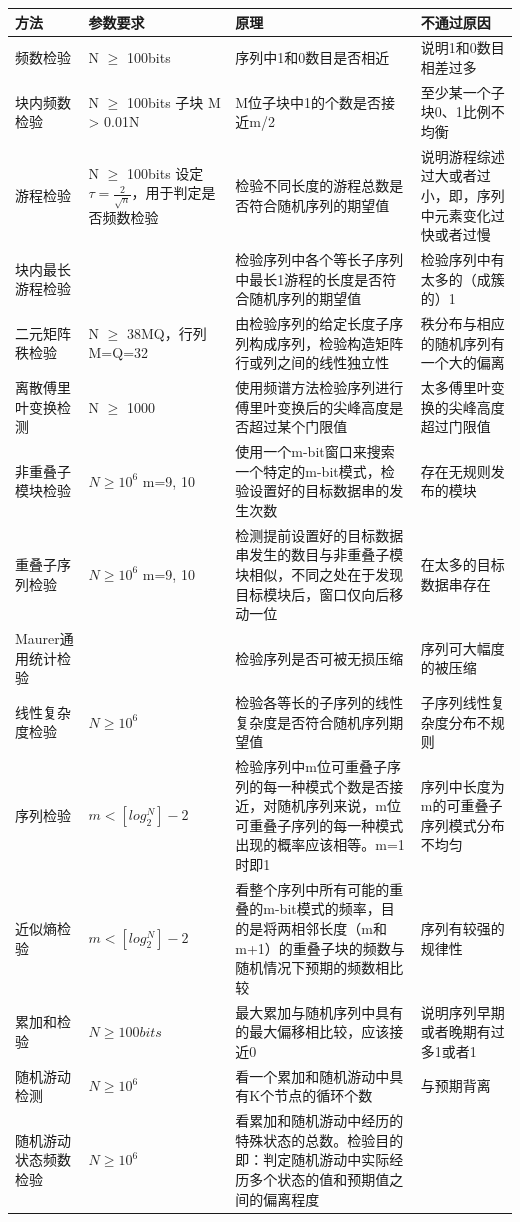 \documentclass[master]{seuthesis} %
\begin{document}
\begin{Main}
\begin{table}[]
    \begin{tabular}{p{70pt}p{70pt}p{200pt}p{100pt}}
    \hline
    方法 & 参数要求 & 原理 & 不通过原因 \\ \hline
    频数检验 & N $\geq$ 100bits & 序列中1和0数目是否相近 & 说明1和0数目相差过多  \\ \hline
    块内频数检验 & N $\geq$ 100bits 子块 M > 0.01N & M位子块中1的个数是否接近m/2 & 至少某一个子块0、1比例不均衡 \\ \hline
    游程检验 & N $\geq$ 100bits 设定$\tau = \frac{2}{\sqrt{n}}$，用于判定是否频数检验 & 检验不同长度的游程总数是否符合随机序列的期望值 & 说明游程综述过大或者过小，即，序列中元素变化过快或者过慢  \\ \hline
    块内最长游程检验 &  & 检验序列中各个等长子序列中最长1游程的长度是否符合随机序列的期望值 & 检验序列中有太多的（成簇的）1 \\ \hline
    二元矩阵秩检验 & N $\geq$ 38MQ，行列M=Q=32 & 由检验序列的给定长度子序列构成序列，检验构造矩阵行或列之间的线性独立性 & 秩分布与相应的随机序列有一个大的偏离 \\ \hline
    离散傅里叶变换检测 & N $\geq$ 1000 & 使用频谱方法检验序列进行傅里叶变换后的尖峰高度是否超过某个门限值 & 太多傅里叶变换的尖峰高度超过门限值 \\ \hline
    非重叠子模块检验 & $ N \geq 10^6$  m={9, 10} & 使用一个m-bit窗口来搜索一个特定的m-bit模式，检验设置好的目标数据串的发生次数 & 存在无规则发布的模块 \\ \hline
    重叠子序列检验 & $N \geq 10^6$ m={9, 10} & 检测提前设置好的目标数据串发生的数目与非重叠子模块相似，不同之处在于发现目标模块后，窗口仅向后移动一位 & 在太多的目标数据串存在 \\ \hline
    Maurer通用统计检验 & & 检验序列是否可被无损压缩 & 序列可大幅度的被压缩 \\ \hline
    线性复杂度检验 & $N \geq 10^6$ & 检验各等长的子序列的线性复杂度是否符合随机序列期望值 & 子序列线性复杂度分布不规则 \\ \hline
    序列检验 & $ m < [log_2^N] - 2$ & 检验序列中m位可重叠子序列的每一种模式个数是否接近，对随机序列来说，m位可重叠子序列的每一种模式出现的概率应该相等。m=1时即1 & 序列中长度为m的可重叠子序列模式分布不均匀 \\ \hline
    近似熵检验 & $ m < [log_2^N] - 2$ & 看整个序列中所有可能的重叠的m-bit模式的频率，目的是将两相邻长度（m和m+1）的重叠子块的频数与随机情况下预期的频数相比较 & 序列有较强的规律性 \\ \hline
    累加和检验 & $N \geq 100bits$ & 最大累加与随机序列中具有的最大偏移相比较，应该接近0 & 说明序列早期或者晚期有过多1或者1 \\ \hline
    随机游动检测 & $N \geq 10^6$ & 看一个累加和随机游动中具有K个节点的循环个数 & 与预期背离 \\ \hline
    随机游动状态频数检验 & $N \geq 10^6 $ & 看累加和随机游动中经历的特殊状态的总数。检验目的即：判定随机游动中实际经历多个状态的值和预期值之间的偏离程度 \\ \hline


\end{tabular}
\end{table}
\end{Main}
\end{document}
